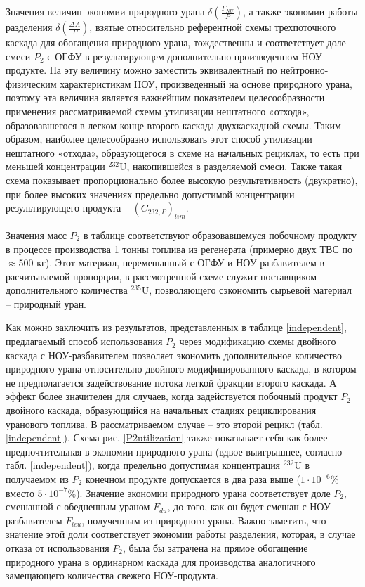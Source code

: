 Значения величин экономии природного урана $\delta(\frac{F_{NU}}{P})$, а также экономии работы разделения $\delta(\frac{\Delta A}{P})$, взятые относительно референтной схемы трехпоточного каскада для обогащения природного урана, тождественны и соответствует доле смеси $P_2$ с ОГФУ в результирующем дополнительно произведенном НОУ-продукте. На эту величину можно заместить эквивалентный по нейтронно-физическим характеристикам НОУ, произведенный на основе природного урана, поэтому эта величина является важнейшим показателем целесообразности применения рассматриваемой схемы утилизации нештатного «отхода», образовавшегося в легком конце второго каскада двухкаскадной схемы. Таким образом, наиболее целесообразно использовать этот способ утилизации нештатного «отхода», образующегося в схеме на начальных рециклах, то есть при меньшей концентрации $^{232}$U, накопившейся в разделяемой смеси. Также  такая схема показывает пропорционально более высокую результативность (двукратно), при более высоких значениях предельно допустимой концентрации результирующего продукта -- $(C_{232,P})_{lim}$.


Значения масс $P_2$ в таблице соответствуют образовавшемуся побочному продукту в процессе производства 1 тонны топлива из регенерата (примерно двух ТВС по $\approx$500 кг). Этот материал, перемешанный с ОГФУ и НОУ-разбавителем в расчитываемой пропорции, в рассмотренной схеме служит поставщиком дополнительного количества $^{235}$U, позволяющего сэкономить сырьевой материал -- природный уран.

Как можно заключить из результатов, представленных в таблице \ref{independent}, предлагаемый способ использования $P_2$ через модификацию схемы двойного каскада с НОУ-разбавителем позволяет экономить дополнительное количество природного урана относительно двойного модифицированного каскада, в котором не предполагается задействование потока легкой фракции второго каскада. А эффект более значителен для случаев, когда задействуется побочный продукт $P_2$ двойного каскада, образующийся на начальных стадиях рециклирования уранового топлива. В рассматриваемом случае -- это второй рецикл (табл. \ref{independent}). Схема рис. \ref{P2utilization} также показывает себя как более предпочтительная в экономии природного урана (вдвое выигрышнее, согласно табл. \ref{independent}), когда предельно допустимая концентрация $^{232}$U в получаемом из $P_2$ конечном продукте допускается в два раза выше ($1\cdot10^{-6}$\% вместо $5\cdot10^{-7}$\%).  Значение экономии природного урана соответствует доле $P_2$, смешанной с обедненным ураном $F_{du}$, до того, как он будет смешан с НОУ-разбавителем $F_{leu}$, полученным из природного урана. Важно заметить, что значение этой доли соответствует экономии работы разделения, которая, в случае отказа от использования $P_2$, была бы затрачена на прямое обогащение природного урана в ординарном каскада для производства аналогичного замещающего количества свежего НОУ-продукта.

